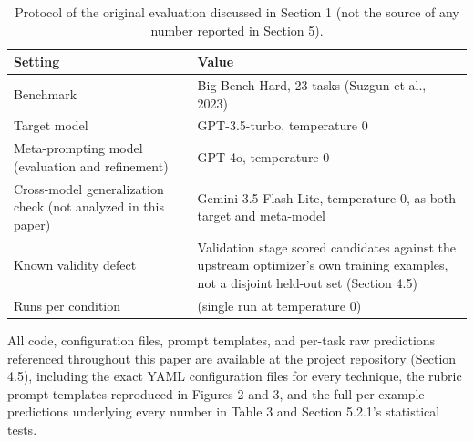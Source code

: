 \documentclass[a4paper,fleqn]{cas-sc}
\begin{document}
\begin{table}[htbp]
\centering
\small
\caption{Protocol of the original evaluation discussed in Section 1 (not the source of any number reported in Section 5).}
\begin{tabular}{>{\raggedright\arraybackslash}p{0.4\linewidth}>{\raggedright\arraybackslash}p{0.6\linewidth}}
\toprule
\textbf{Setting} & \textbf{Value} \\
\midrule
Benchmark & Big-Bench Hard, 23 tasks (Suzgun et al., 2023) \\
Target model & GPT-3.5-turbo, temperature 0 \\
Meta-prompting model (evaluation and refinement) & GPT-4o, temperature 0 \\
Cross-model generalization check (not analyzed in this paper) & Gemini 3.5 Flash-Lite, temperature 0, as both target and meta-model \\
Known validity defect & Validation stage scored candidates against the upstream optimizer's own training examples, not a disjoint held-out set (Section 4.5) \\
Runs per condition & 1 (single run at temperature 0) \\
\bottomrule
\end{tabular}
\end{table}

All code, configuration files, prompt templates, and per-task raw predictions referenced throughout this paper are available at the project repository (Section 4.5), including the exact YAML configuration files for every technique, the rubric prompt templates reproduced in Figures 2 and 3, and the full per-example predictions underlying every number in Table 3 and Section 5.2.1's statistical tests.




\end{document}

